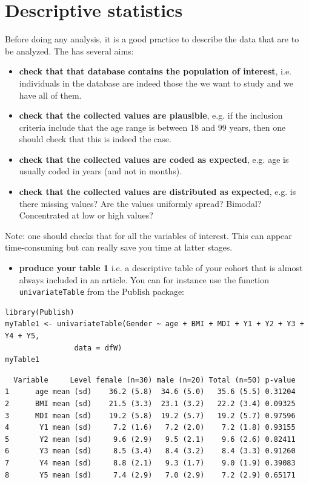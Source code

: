 \documentclass{article}
\begin{document}
\section{Descriptive statistics}
\label{sec:descriptive}
Before doing any analysis, it is a good practice to describe the data
that are to be analyzed. The has several aims:
\begin{itemize}
\item \textbf{check that that database contains the population of interest},
i.e. individuals in the database are indeed those the we want to
study and we have all of them.
\item \textbf{check that the collected values are plausible}, e.g. if the inclusion
criteria include that the age range is between 18 and 99 years, then
one should check that this is indeed the case.
\item \textbf{check that the collected values are coded as expected}, e.g. age is
usually coded in years (and not in months).
\item \textbf{check that the collected values are distributed as expected},
e.g. is there missing values? Are the values uniformly spread?
Bimodal? Concentrated at low or high values?
\end{itemize}

Note: one should checks that for all the variables of interest. This
can appear time-consuming but can really save you time at latter
stages. 

\begin{itemize}
\item \textbf{produce your table 1} i.e. a descriptive table of your cohort that
is almost always included in an article. You can for instance use
the function \texttt{univariateTable} from the Publish package:
\end{itemize}
\lstset{language=r,label= ,caption= ,captionpos=b,numbers=none}
\begin{lstlisting}
library(Publish)
myTable1 <- univariateTable(Gender ~ age + BMI + MDI + Y1 + Y2 + Y3 + Y4 + Y5, 
			    data = dfW)
myTable1
\end{lstlisting}

\begin{verbatim}
  Variable     Level female (n=30) male (n=20) Total (n=50) p-value
1      age mean (sd)    36.2 (5.8)  34.6 (5.0)   35.6 (5.5) 0.31204
2      BMI mean (sd)    21.5 (3.3)  23.1 (3.2)   22.2 (3.4) 0.09325
3      MDI mean (sd)    19.2 (5.8)  19.2 (5.7)   19.2 (5.7) 0.97596
4       Y1 mean (sd)     7.2 (1.6)   7.2 (2.0)    7.2 (1.8) 0.93155
5       Y2 mean (sd)     9.6 (2.9)   9.5 (2.1)    9.6 (2.6) 0.82411
6       Y3 mean (sd)     8.5 (3.4)   8.4 (3.2)    8.4 (3.3) 0.91260
7       Y4 mean (sd)     8.8 (2.1)   9.3 (1.7)    9.0 (1.9) 0.39083
8       Y5 mean (sd)     7.4 (2.9)   7.0 (2.9)    7.2 (2.9) 0.65171
\end{verbatim}
\end{document}
